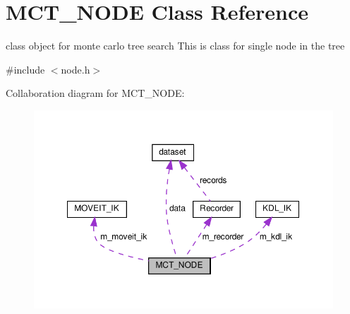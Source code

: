 \hypertarget{classMCT__NODE}{}\section{M\+C\+T\+\_\+\+N\+O\+DE Class Reference}
\label{classMCT__NODE}


class object for monte carlo tree search This is class for single node in the tree  




{\ttfamily \#include $<$node.\+h$>$}



Collaboration diagram for M\+C\+T\+\_\+\+N\+O\+DE\+:
\nopagebreak
\begin{figure}[H]
\begin{center}
\leavevmode
\includegraphics[width=350pt]{classMCT__NODE__coll__graph}
\end{center}
\end{figure}
